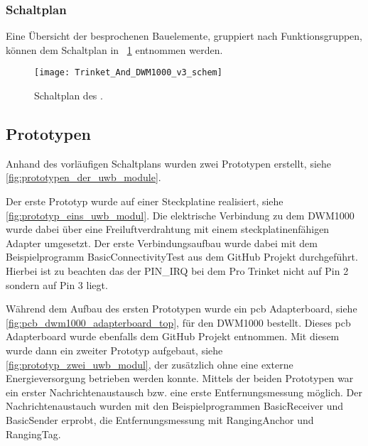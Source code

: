 %
%
\subsubsection{Schaltplan} \label{subsec:schaltplan_uwb_modul}

Eine Übersicht der besprochenen Bauelemente, gruppiert nach Funktionsgruppen, können dem Schaltplan in \figurename~\ref{fig:schaltplan_uwb_modul} entnommen werden.

\begin{figure}
	\texttt{[image: Trinket\_And\_DWM1000\_v3\_schem]}
	\caption{Schaltplan des .}
	\label{fig:schaltplan_uwb_modul}
\end{figure}


%
%
\subsection{Prototypen}

Anhand des vorläufigen Schaltplans wurden zwei Prototypen erstellt, siehe \autoref{fig:prototypen_der_uwb_module}.

Der erste Prototyp wurde auf einer Steckplatine realisiert, siehe \autoref{fig:prototyp_eins_uwb_modul}. Die elektrische Verbindung zu dem DWM1000 wurde dabei über eine Freiluftverdrahtung mit einem steckplatinenfähigen Adapter umgesetzt. Der erste Verbindungsaufbau wurde dabei mit dem Beispielprogramm BasicConnectivityTest aus dem GitHub Projekt \cite{Trojer2015} durchgeführt. Hierbei ist zu beachten das der PIN\_IRQ bei dem Pro Trinket nicht auf Pin 2 sondern auf Pin 3 liegt.

Während dem Aufbau des ersten Prototypen wurde ein \Gls{pcb} Adap\-ter\-board, siehe \autoref{fig:pcb_dwm1000_adapterboard_top}, für den DWM1000 bestellt. Dieses \gls{pcb} Adapterboard wurde ebenfalls dem GitHub Projekt \cite{Trojer2015} entnommen. Mit diesem wurde dann ein zweiter Prototyp aufgebaut, siehe \autoref{fig:prototyp_zwei_uwb_modul}, der zusätzlich ohne eine externe Energieversorgung betrieben werden konnte. Mittels der beiden Prototypen war ein erster Nachrichtenaustausch bzw. eine erste Entfernungsmessung möglich. Der Nachrichtenaustauch wurden mit den Beispielprogrammen BasicReceiver und BasicSender erprobt, die Entfernungsmessung mit RangingAnchor und RangingTag.

